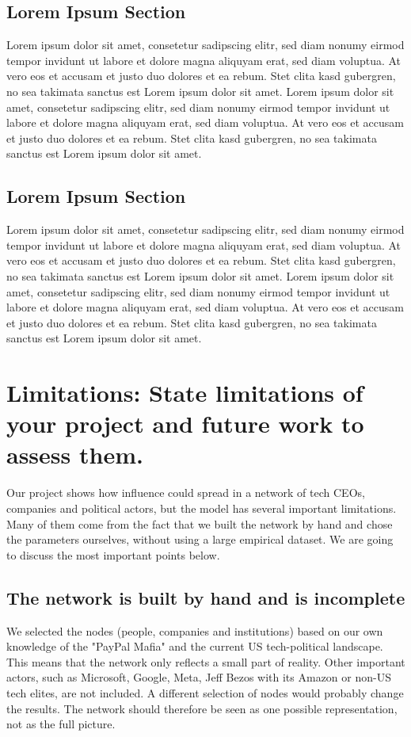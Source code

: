 \documentclass[12pt,a4paper,twocolumn]{article}
\begin{document}
\subsection*{Lorem Ipsum Section}
Lorem ipsum dolor sit amet, consetetur sadipscing elitr, sed diam nonumy eirmod tempor invidunt ut labore et dolore magna aliquyam erat, sed diam voluptua. At vero eos et accusam et justo duo dolores et ea rebum. Stet clita kasd gubergren, no sea takimata sanctus est Lorem ipsum dolor sit amet. Lorem ipsum dolor sit amet, consetetur sadipscing elitr, sed diam nonumy eirmod tempor invidunt ut labore et dolore magna aliquyam erat, sed diam voluptua. At vero eos et accusam et justo duo dolores et ea rebum. Stet clita kasd gubergren, no sea takimata sanctus est Lorem ipsum dolor sit amet.
\vspace{-6pt}

\subsection*{Lorem Ipsum Section}

\noindent Lorem ipsum dolor sit amet, consetetur sadipscing elitr, sed diam nonumy eirmod tempor invidunt ut labore et dolore magna aliquyam erat, sed diam voluptua. At vero eos et accusam et justo duo dolores et ea rebum. Stet clita kasd gubergren, no sea takimata sanctus est Lorem ipsum dolor sit amet. Lorem ipsum dolor sit amet, consetetur sadipscing elitr, sed diam nonumy eirmod tempor invidunt ut labore et dolore magna aliquyam erat, sed diam voluptua. At vero eos et accusam et justo duo dolores et ea rebum. Stet clita kasd gubergren, no sea takimata sanctus est Lorem ipsum dolor sit amet.

\section{Limitations: State limitations of your project and future work to assess them.}

Our project shows how influence could spread in a network of tech CEOs, companies and political actors, but the model has several important limitations. Many of them come from the fact that we built the network by hand and chose the parameters ourselves, without using a large empirical dataset. We are going to discuss the most important points below.

\subsection{The network is built by hand and is incomplete}
We selected the nodes (people, companies and institutions) based on our own knowledge of the "PayPal Mafia" and the current US tech-political landscape. This means that the network only reflects a small part of reality. Other important actors, such as Microsoft, Google, Meta, Jeff Bezos with its Amazon or non-US tech elites, are not included. A different selection of nodes would probably change the results. The network should therefore be seen as one possible representation, not as the full picture.
\end{document}
